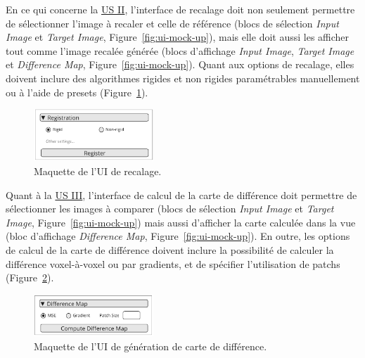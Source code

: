 \documentclass{article}
\begin{document}
{{        \bigskip

        En ce qui concerne la \hyperref[us:registration]{US II}, l'interface de recalage doit non seulement permettre de sélectionner l'image à recaler et celle de référence (blocs de sélection \textit{Input Image} et \textit{Target Image}, Figure~\ref{fig:ui-mock-up}), mais elle doit aussi les afficher tout comme l'image recalée générée (blocs d'affichage \textit{Input Image}, \textit{Target Image} et \textit{Difference Map}, Figure~\ref{fig:ui-mock-up}).
        Quant aux options de recalage, elles doivent inclure des algorithmes rigides et non rigides paramétrables manuellement ou à l'aide de presets (Figure~\ref{fig:registration-ui-mock-up}).

        \begin{figure}[!ht]
            \centering
            \includegraphics[width=0.4\textwidth]{images/registration-ui-mock-up.png}
            \caption{Maquette de l'UI de recalage.}
            \label{fig:registration-ui-mock-up}
        \end{figure}

        \newpage

        Quant à la \hyperref[us:diff-map]{US III}, l'interface de calcul de la carte de différence doit permettre de sélectionner les images à comparer (blocs de sélection \textit{Input Image} et \textit{Target Image}, Figure~\ref{fig:ui-mock-up}) mais aussi d'afficher la carte calculée dans la vue (bloc d'affichage \textit{Difference Map}, Figure~\ref{fig:ui-mock-up}).
        En outre, les options de calcul de la carte de différence doivent inclure la possibilité de calculer la différence voxel-à-voxel ou par gradients, et de spécifier l'utilisation de patchs (Figure~\ref{fig:diff-map-ui-mock-up}).

        \begin{figure}[!ht]
            \centering
            \includegraphics[width=0.4\textwidth]{images/diff-map-ui-mock-up.png}
            \caption{Maquette de l'UI de génération de carte de différence.}
            \label{fig:diff-map-ui-mock-up}
        \end{figure}

}}
\end{document}

